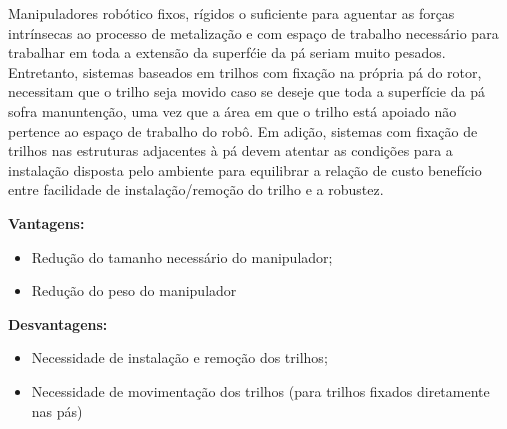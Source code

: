 Manipuladores robótico fixos, rígidos o suficiente para aguentar as forças intrínsecas ao
processo de metalização e com espaço de trabalho necessário para trabalhar em
toda a extensão da superfćie da pá seriam muito pesados.
Entretanto, sistemas baseados em trilhos com fixação na própria pá do rotor, necessitam que
o trilho seja movido caso se deseje que toda a superfície da pá sofra
manuntenção, uma vez que a área em que o trilho está apoiado não pertence ao espaço de
trabalho do robô. Em adição, sistemas com fixação de trilhos nas estruturas
adjacentes à pá devem atentar as condições para a instalação disposta pelo
ambiente para equilibrar a relação de custo benefício entre facilidade de
instalação/remoção do trilho e a robustez.

\textbf{Vantagens:}
\begin{itemize}
  \item Redução do tamanho necessário do manipulador;
  \item Redução do peso do manipulador
\end{itemize}

\textbf{Desvantagens:}
\begin{itemize}
  \item Necessidade de instalação e remoção dos trilhos;
  \item Necessidade de movimentação dos trilhos (para trilhos fixados
  diretamente nas pás)
\end{itemize}




